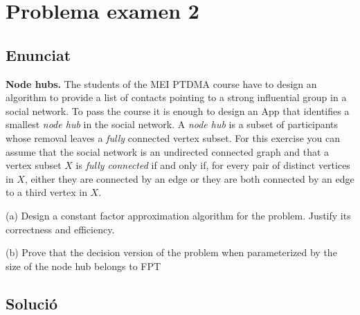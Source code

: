 \section{Problema examen 2}
\subsection{Enunciat}
\textbf{Node hubs.} The students of the MEI PTDMA course have to design an algorithm to provide a list of contacts pointing to a strong influential group in a social network. To pass the course it is enough to design an App that identifies a smallest \textit{node hub} in the social network. A \textit{node hub} is a subset of participants whose removal leaves a \textit{fully} connected vertex subset. For this exercise you can assume that the social network is an undirected connected graph and
that a vertex subset $X$ is \textit{fully connected} if and only if, for every pair of distinct vertices in $X$, either they are connected by an edge or they are both connected by an edge to a third vertex in $X$.


(a) Design a constant factor approximation algorithm for the problem. Justify its correctness and efficiency. 

(b) Prove that the decision version of the problem when parameterized by the size of the node hub belongs to FPT

\subsection{Solució}